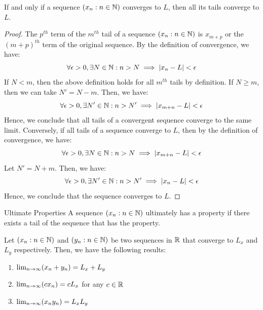 \documentclass[openany]{book}
\begin{document}
\begin{mytheorem}
    If and only if a sequence $(x_n : n \in \mathbb{N})$ converges to $L$, then all its tails converge to $L$. 
\end{mytheorem}
\begin{proof}
    The $p^{th}$ term of the $m^{th}$ tail of a sequence $(x_n : n \in \mathbb{N})$ is $x_{m+p}$ or the $(m+p)^{th}$ term of the original sequence. 
    By the definition of convergence, we have:
    $$\forall \epsilon > 0, \exists N \in \mathbb{N}: n > N \implies |x_n - L| < \epsilon$$
    If $N< m$, then the above definition holds for all $m^{th}$ tails by definition. 
    If $N \geq m$, then we can take $N' = N - m$. Then, we have:
    $$\forall \epsilon > 0, \exists N' \in \mathbb{N}: n > N' \implies |x_{m+n} - L| < \epsilon$$
    Hence, we conclude that all tails of a convergent sequence converge to the same limit.
    Conversely, if all tails of a sequence converge to $L$, then by the definition of convergence, we have:
    $$\forall \epsilon > 0, \exists N \in \mathbb{N}: n > N \implies |x_{m+n} - L| < \epsilon$$
    Let $N' = N + m$. Then, we have:
    $$\forall \epsilon > 0, \exists N' \in \mathbb{N}: n > N' \implies |x_n - L| < \epsilon$$
    Hence, we conclude that the sequence converges to $L$.
\end{proof}
\begin{mydefinition}{Ultimate Properties}
    A sequence $(x_n : n \in \mathbb{N})$ ultimately has a property if there exists a tail of the sequence that has the property.
\end{mydefinition}
\begin{mytheorem}
    Let $(x_n : n \in \mathbb{N})$ and $(y_n : n \in \mathbb{N})$ be two sequences in $\mathbb{R}$ that converge to $L_x$ and $L_y$ respectively. Then, we have the following results:
    \begin{enumerate}
        \item $\lim_{n \to \infty} (x_n + y_n) = L_x + L_y$
        \item $\lim_{n \to \infty} (cx_n) = c L_x$ for any $c \in \mathbb{R}$
        \item $\lim_{n \to \infty} (x_n y_n) = L_x L_y$
    \end{enumerate}
\end{mytheorem}
\end{document}
